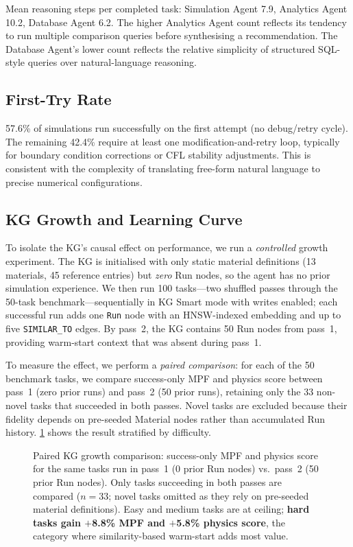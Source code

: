 \documentclass[twocolumn]{article}
\begin{document}
Mean reasoning steps per completed task: Simulation Agent 7.9,
Analytics Agent 10.2, Database Agent 6.2.  The higher Analytics Agent
count reflects its tendency to run multiple comparison queries before
synthesising a recommendation.  The Database Agent's lower count
reflects the relative simplicity of structured SQL-style queries over
natural-language reasoning.

\subsection{First-Try Rate}

57.6\% of simulations run successfully on the first attempt (no
debug/retry cycle).  The remaining 42.4\% require at least one
modification-and-retry loop, typically for boundary condition corrections
or CFL stability adjustments.  This is consistent with the complexity
of translating free-form natural language to precise numerical
configurations.

\subsection{KG Growth and Learning Curve}
\label{sec:kg-growth}

To isolate the KG's causal effect on performance, we run a
\emph{controlled} growth experiment.  The KG is initialised with only
static material definitions (13 materials, 45 reference entries) but
\emph{zero} Run nodes, so the agent has no prior simulation experience.
We then run 100 tasks---two shuffled passes through the 50-task
benchmark---sequentially in KG Smart mode with writes enabled; each
successful run adds one \texttt{Run} node with an HNSW-indexed
embedding and up to five \texttt{SIMILAR\_TO} edges.  By pass~2, the
KG contains 50 Run nodes from pass~1, providing warm-start context
that was absent during pass~1.

To measure the effect, we perform a \emph{paired comparison}: for
each of the 50 benchmark tasks, we compare success-only MPF and
physics score between pass~1 (zero prior runs) and pass~2 (50 prior
runs), retaining only the 33 non-novel tasks that succeeded in both
passes.  Novel tasks are excluded because their fidelity depends on
pre-seeded Material nodes rather than accumulated Run history.
\cref{fig:kg-growth} shows the result stratified by difficulty.

\begin{figure}[htbp]
  \centering
  \resizebox{\linewidth}{!}{}
  \caption{Paired KG growth comparison: success-only MPF and physics
    score for the same tasks run in pass~1 (0 prior Run nodes) vs.\
    pass~2 (50 prior Run nodes).  Only tasks succeeding in both passes
    are compared ($n{=}33$; novel tasks omitted as they rely on
    pre-seeded material definitions).  Easy and medium tasks are at
    ceiling; \textbf{hard tasks gain $+$8.8\% MPF and $+$5.8\% physics
    score}, the category where similarity-based warm-start adds most
    value.}
  \label{fig:kg-growth}
\end{figure}
\end{document}
